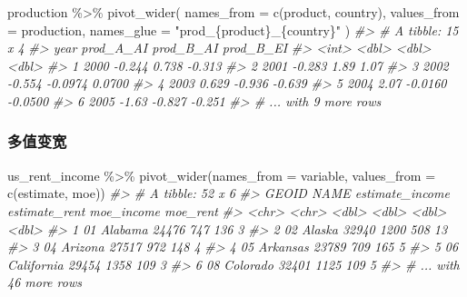 \documentclass[
]{book}
\newenvironment{Shaded}{\begin{snugshade}}{\end{snugshade}}
\newcommand{\AttributeTok}[1]{\textcolor[rgb]{0.77,0.63,0.00}{#1}}
\newcommand{\CommentTok}[1]{\textcolor[rgb]{0.56,0.35,0.01}{\textit{#1}}}
\newcommand{\FunctionTok}[1]{\textcolor[rgb]{0.00,0.00,0.00}{#1}}
\newcommand{\NormalTok}[1]{#1}
\newcommand{\SpecialCharTok}[1]{\textcolor[rgb]{0.00,0.00,0.00}{#1}}
\newcommand{\StringTok}[1]{\textcolor[rgb]{0.31,0.60,0.02}{#1}}
\begin{document}
\begin{Shaded}
\begin{Highlighting}[]
\NormalTok{production }\SpecialCharTok{\%\textgreater{}\%} \FunctionTok{pivot\_wider}\NormalTok{(}
  \AttributeTok{names\_from =} \FunctionTok{c}\NormalTok{(product, country), }
  \AttributeTok{values\_from =}\NormalTok{ production,}
  \AttributeTok{names\_glue =} \StringTok{"prod\_\{product\}\_\{country\}"}
\NormalTok{)}
\CommentTok{\#\textgreater{} \# A tibble: 15 x 4}
\CommentTok{\#\textgreater{}    year prod\_A\_AI prod\_B\_AI prod\_B\_EI}
\CommentTok{\#\textgreater{}   \textless{}int\textgreater{}     \textless{}dbl\textgreater{}     \textless{}dbl\textgreater{}     \textless{}dbl\textgreater{}}
\CommentTok{\#\textgreater{} 1  2000    {-}0.244    0.738    {-}0.313 }
\CommentTok{\#\textgreater{} 2  2001    {-}0.283    1.89      1.07  }
\CommentTok{\#\textgreater{} 3  2002    {-}0.554   {-}0.0974    0.0700}
\CommentTok{\#\textgreater{} 4  2003     0.629   {-}0.936    {-}0.639 }
\CommentTok{\#\textgreater{} 5  2004     2.07    {-}0.0160   {-}0.0500}
\CommentTok{\#\textgreater{} 6  2005    {-}1.63    {-}0.827    {-}0.251 }
\CommentTok{\#\textgreater{} \# ... with 9 more rows}
\end{Highlighting}
\end{Shaded}

\hypertarget{ux591aux503cux53d8ux5bbd}{%
\subsubsection{多值变宽}\label{ux591aux503cux53d8ux5bbd}}

\begin{Shaded}
\begin{Highlighting}[]
\NormalTok{us\_rent\_income }\SpecialCharTok{\%\textgreater{}\%} 
  \FunctionTok{pivot\_wider}\NormalTok{(}\AttributeTok{names\_from =}\NormalTok{ variable, }\AttributeTok{values\_from =} \FunctionTok{c}\NormalTok{(estimate, moe))}
\CommentTok{\#\textgreater{} \# A tibble: 52 x 6}
\CommentTok{\#\textgreater{}   GEOID NAME       estimate\_income estimate\_rent moe\_income moe\_rent}
\CommentTok{\#\textgreater{}   \textless{}chr\textgreater{} \textless{}chr\textgreater{}                \textless{}dbl\textgreater{}         \textless{}dbl\textgreater{}      \textless{}dbl\textgreater{}    \textless{}dbl\textgreater{}}
\CommentTok{\#\textgreater{} 1 01    Alabama              24476           747        136        3}
\CommentTok{\#\textgreater{} 2 02    Alaska               32940          1200        508       13}
\CommentTok{\#\textgreater{} 3 04    Arizona              27517           972        148        4}
\CommentTok{\#\textgreater{} 4 05    Arkansas             23789           709        165        5}
\CommentTok{\#\textgreater{} 5 06    California           29454          1358        109        3}
\CommentTok{\#\textgreater{} 6 08    Colorado             32401          1125        109        5}
\CommentTok{\#\textgreater{} \# ... with 46 more rows}
\end{Highlighting}
\end{Shaded}
\end{document}
